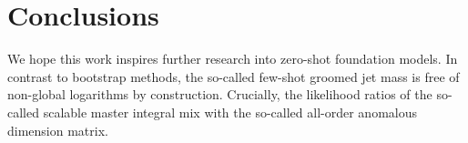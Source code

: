\section{Conclusions}\label{sec:conclusions}

We hope this work inspires further research into zero-shot foundation
models. In contrast to bootstrap methods, the so-called few-shot groomed
jet mass is free of non-global logarithms by construction. Crucially,
the likelihood ratios of the so-called scalable master integral mix with
the so-called all-order anomalous dimension matrix.


